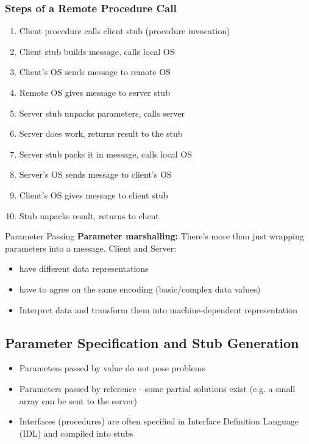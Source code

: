 \subsubsection{Steps of a Remote Procedure Call}
\begin{enumerate}
	\item Client procedure calls client stub (procedure invocation)
	\item Client stub builds message, calls local OS
	\item Client's OS sends message to remote OS
	\item Remote OS gives message to server stub
	\item Server stub unpacks parameters, calls server
	\item Server does work, returns result to the stub
	\item Server stub packs it in message, calls local OS
	\item Server's OS sends message to client's OS
	\item Client's OS gives message to client stub
	\item Stub unpacks result, returns to client
\end{enumerate}

\begin{note}{Parameter Passing}
	\textbf{Parameter marshalling:} There's more than just wrapping parameters into a message. Client and Server:
	\begin{itemize}
		\item have different data representations
		\item have to agree on the same encoding (basic/complex data values)
		\item Interpret data and transform them into machine-dependent representation	
	\end{itemize}
\end{note}

\subsection{Parameter Specification and Stub Generation}
\begin{itemize}
	\item Parameters passed by value do not pose problems
	\item Parameters passed by reference - some partial solutions exist (e.g. a small array can be sent to the server)
	\item Interfaces (procedures) are often specified in Interface Definition Language (IDL) and compiled into stubs	
\end{itemize}

